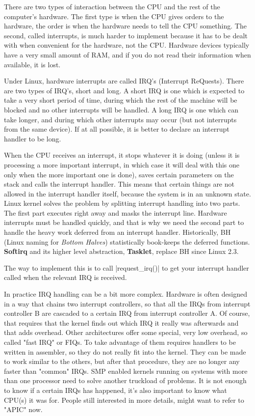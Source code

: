 \documentclass[10pt, oneside]{book}
\begin{document}
There are two types of interaction between the CPU and the rest of the computer's hardware.
The first type is when the CPU gives orders to the hardware, the order is when the hardware needs to tell the CPU something.
The second, called interrupts, is much harder to implement because it has to be dealt with when convenient for the hardware, not the CPU.
Hardware devices typically have a very small amount of RAM, and if you do not read their information when available, it is lost.

Under Linux, hardware interrupts are called IRQ's (Interrupt ReQuests).
There are two types of IRQ's, short and long.
A short IRQ is one which is expected to take a very short period of time, during which the rest of the machine will be blocked and no other interrupts will be handled.
A long IRQ is one which can take longer, and during which other interrupts may occur (but not interrupts from the same device).
If at all possible, it is better to declare an interrupt handler to be long.

When the CPU receives an interrupt, it stops whatever it is doing (unless it is processing a more important interrupt, in which case it will deal with this one only when the more important one is done),
saves certain parameters on the stack and calls the interrupt handler.
This means that certain things are not allowed in the interrupt handler itself, because the system is in an unknown state.
Linux kernel solves the problem by splitting interrupt handling into two parts.
The first part executes right away and masks the interrupt line.
Hardware interrupts must be handled quickly, and that is why we need the second part to handle the heavy work deferred from an interrupt handler.
Historically, BH (Linux naming for \textit{Bottom Halves}) statistically book-keeps the deferred functions.
\textbf{Softirq} and its higher level abstraction, \textbf{Tasklet}, replace BH since Linux 2.3.

The way to implement this is to call \cpp|request_irq()| to get your interrupt handler called when the relevant IRQ is received.

In practice IRQ handling can be a bit more complex.
Hardware is often designed in a way that chains two interrupt controllers, so that all the IRQs from interrupt controller B are cascaded to a certain IRQ from interrupt controller A.
Of course, that requires that the kernel finds out which IRQ it really was afterwards and that adds overhead. Other architectures offer some special, very low overhead, so called "fast IRQ" or FIQs.
To take advantage of them requires handlers to be written in assembler, so they do not really fit into the kernel.
They can be made to work similar to the others, but after that procedure, they are no longer any faster than "common" IRQs.
SMP enabled kernels running on systems with more than one processor need to solve another truckload of problems.
It is not enough to know if a certain IRQs has happened, it's also important to know what CPU(s) it was for.
People still interested in more details, might want to refer to "APIC" now.
\end{document}
